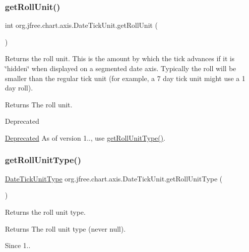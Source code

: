\subsubsection{\texorpdfstring{get\+Roll\+Unit()}{getRollUnit()}}
{\footnotesize\ttfamily int org.\+jfree.\+chart.\+axis.\+Date\+Tick\+Unit.\+get\+Roll\+Unit (\begin{DoxyParamCaption}{ }\end{DoxyParamCaption})}

Returns the roll unit. This is the amount by which the tick advances if it is \char`\"{}hidden\char`\"{} when displayed on a segmented date axis. Typically the roll will be smaller than the regular tick unit (for example, a 7 day tick unit might use a 1 day roll).

\begin{DoxyReturn}{Returns}
The roll unit.
\end{DoxyReturn}
\begin{DoxyRefDesc}{Deprecated}
\item[\mbox{\hyperlink{deprecated__deprecated000020}{Deprecated}}]As of version 1.., use \mbox{\hyperlink{classorg_1_1jfree_1_1chart_1_1axis_1_1_date_tick_unit_a319b0105aedad327b40ad344007cff8c}{get\+Roll\+Unit\+Type()}}. \end{DoxyRefDesc}
\mbox{\label{classorg_1_1jfree_1_1chart_1_1axis_1_1_date_tick_unit_a319b0105aedad327b40ad344007cff8c}} 
\subsubsection{\texorpdfstring{get\+Roll\+Unit\+Type()}{getRollUnitType()}}
{\footnotesize\ttfamily \mbox{\hyperlink{classorg_1_1jfree_1_1chart_1_1axis_1_1_date_tick_unit_type}{Date\+Tick\+Unit\+Type}} org.\+jfree.\+chart.\+axis.\+Date\+Tick\+Unit.\+get\+Roll\+Unit\+Type (\begin{DoxyParamCaption}{ }\end{DoxyParamCaption})}

Returns the roll unit type.

\begin{DoxyReturn}{Returns}
The roll unit type (never {\ttfamily null}).
\end{DoxyReturn}
\begin{DoxySince}{Since}
1.. 
\end{DoxySince}
\mbox{\label{classorg_1_1jfree_1_1chart_1_1axis_1_1_date_tick_unit_ab14b94a52e03839067716491e7872aee}} 
